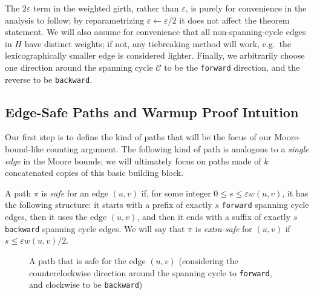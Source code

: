 \documentclass{theoretics}
\newcommand{\eps}{\varepsilon}
\newcommand{\cee}{\mathcal{C}}
\newcommand{\forward}{\texttt{forward}}
\newcommand{\backward}{\texttt{backward}}
\begin{document}
The $2\eps$ term in the weighted girth, rather than $\eps$, is purely for convenience in the analysis to follow; by reparametrizing $\eps \gets \eps/2$ it does not affect the theorem statement.
We will also assume for convenience that all non-spanning-cycle edges in $H$ have distinct weights; if not, any tiebreaking method will work, e.g.\ the lexicographically smaller edge is considered lighter.
Finally, we arbitrarily choose one direction around the spanning cycle $\cee$ to be the \forward{} direction, and the reverse to be \backward{}.

\subsection{Edge-Safe Paths and Warmup Proof Intuition}

Our first step is to define the kind of paths that will be the focus of our Moore-bound-like counting argument.
The following kind of path is analogous to a \emph{single edge} in the Moore bounds; we will ultimately focus on paths made of $k$ concatenated copies of this basic building block.

\begin{definition} 
A path $\pi$ is \emph{safe} for an edge $(u, v)$ if, for some integer $0 \le s \le \eps w(u, v)$, it has the following structure: it starts with a prefix of exactly $s$ \forward{} spanning cycle edges, then it uses the edge $(u, v)$, and then it ends with a suffix of exactly $s$ \backward{} spanning cycle edges.
We will say that $\pi$ is \emph{extra-safe} for $(u, v)$ if $s \le \eps w(u, v)/2$.
\end{definition}

\begin{figure}[h]
\begin{center}
\end{center}
\caption{A path that is safe for the edge $(u, v)$ (considering the counterclockwise direction around the spanning cycle to \forward{}, and clockwise to be \backward{})}
\end{figure}
\end{document}
